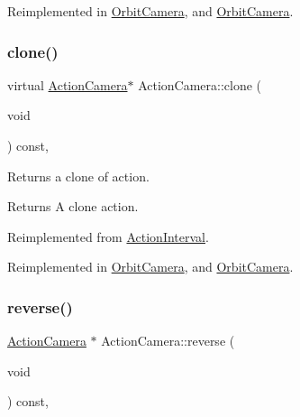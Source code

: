 Reimplemented in \hyperlink{classOrbitCamera_ad3d72a156be5170c01b62a53bf4d6756}{Orbit\+Camera}, and \hyperlink{classOrbitCamera_aed66da45d80c719cf06f603875b89ed4}{Orbit\+Camera}.

\mbox{\label{classActionCamera_a77342a783d5575d2efc6a9c8823c810d}} 
\subsubsection{\texorpdfstring{clone()}{clone()}\hspace{0.1cm}{\footnotesize\ttfamily [2/2]}}
{\footnotesize\ttfamily virtual \hyperlink{classActionCamera}{Action\+Camera}$\ast$ Action\+Camera\+::clone (\begin{DoxyParamCaption}\item[{void}]{ }\end{DoxyParamCaption}) const\hspace{0.3cm}{\ttfamily [override]}, {\ttfamily [virtual]}}

Returns a clone of action.

\begin{DoxyReturn}{Returns}
A clone action. 
\end{DoxyReturn}


Reimplemented from \hyperlink{classActionInterval_abc93ce0c2f54a90eb216a7803f25f44a}{Action\+Interval}.



Reimplemented in \hyperlink{classOrbitCamera_ad3d72a156be5170c01b62a53bf4d6756}{Orbit\+Camera}, and \hyperlink{classOrbitCamera_aed66da45d80c719cf06f603875b89ed4}{Orbit\+Camera}.

\mbox{\label{classActionCamera_aeac79c93c92de723838a30e59fb011a9}} 
\subsubsection{\texorpdfstring{reverse()}{reverse()}\hspace{0.1cm}{\footnotesize\ttfamily [1/2]}}
{\footnotesize\ttfamily \hyperlink{classActionCamera}{Action\+Camera} $\ast$ Action\+Camera\+::reverse (\begin{DoxyParamCaption}\item[{void}]{ }\end{DoxyParamCaption}) const\hspace{0.3cm}{\ttfamily [override]}, {\ttfamily [virtual]}}

